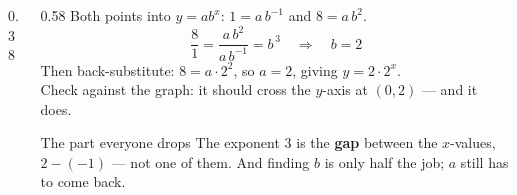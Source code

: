 \documentclass[aspectratio=169, 11pt]{beamer}
\newcommand{\lgrid}[4]{%
  \draw[step=1, linegray!45, thin] (#1,#3) grid (#2,#4);
  \draw[->, thick, charcoal] (#1,0)--(#2,0) node[below right, font=\tiny]{$x$};
  \draw[->, thick, charcoal] (0,#3)--(0,#4) node[left, font=\tiny]{$y$};}
\newcommand{\expcurve}[4]{\draw[very thick, forest, domain=#3:#4, samples=120, smooth]
  plot (\x,{#1*exp((#2)*(\x))});}
\begin{document}
\begin{frame}[t, plain]
  \begin{columns}[T]
    \begin{column}{0.38\textwidth}
      \centering
    \end{column}
    \begin{column}{0.58\textwidth}
      \footnotesize
      Both points into $y=ab^{x}$: \quad $1=a\,b^{-1}$ \; and \; $8=a\,b^{2}$.
      \[ \frac{8}{1} = \frac{a\,b^{2}}{a\,b^{-1}} = b^{\,3} \quad\Rightarrow\quad b=2 \]
      Then back-substitute: \; $8=a\cdot 2^{2}$, so $a=2$, giving $y=2\cdot2^{x}$. \\[4pt]
      Check against the graph: it should cross the $y$-axis at $(0,2)$ --- and it does.
      \vspace{3pt}
      \begin{block}{The part everyone drops}
        The exponent $3$ is the \textbf{gap} between the $x$-values, $2-(-1)$ --- not one of them.
        And finding $b$ is only half the job; $a$ still has to come back.
      \end{block}
    \end{column}
  \end{columns}
\end{frame}
\end{document}
